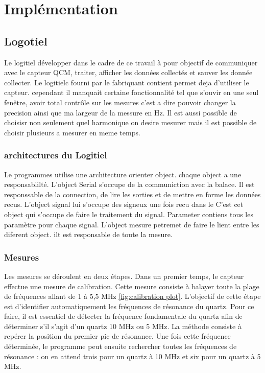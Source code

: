 \chapter{Implémentation}

\section{Logotiel}
Le logitiel développer dans le cadre de ce travail à pour objectif de communiquer avec le capteur QCM, traiter, afficher les données collectés et sauver les donnée collecter.
Le logitielc fourni par le fabriquant contient permet deja d'utiliser le capteur. cependant il manquait certaine fonctionnalité tel que s'ouvir en une seul fenêtre,
avoir total contrôle sur les mesures c'est a dire pouvoir changer la precision ainsi que ma largeur de la messure en Hz. 
Il est aussi possible de choisisr non seulement quel harmonique on desire mesurer mais il est possible de choisir plusieurs a mesurer en meme temps.
\subsection{architectures du Logitiel}
Le programmes utilise une architecture orienter object. chaque object a une responsablilté. L'object Serial s'occupe de la communiction avec la balace. Il est responssable de la connection, de lire les sorties et de mettre en forme les données recus.
L'object signal lui s'occupe des signeux une fois recu dans le C'est cet object qui s'occupe de faire le traitement du signal. Parameter contiens tous les paramètre pour chaque signal. L'object mesure petremet de faire le lient entre les diferent object. ilt est responsable de toute la mesure. 

\subsection{Mesures}
Les mesures se déroulent en deux étapes.
Dans un premier temps, le capteur effectue une mesure de calibration. Cette mesure consiste à balayer toute la plage de fréquences allant de 1 à 5,5 MHz \ref{fig:calibration plot}.
L’objectif de cette étape est d’identifier automatiquement les fréquences de résonance du quartz. Pour ce faire, il est essentiel de détecter la fréquence fondamentale du quartz afin de déterminer s’il s’agit d’un quartz 10 MHz ou 5 MHz.
La méthode consiste à repérer la position du premier pic de résonance. Une fois cette fréquence déterminée, le programme peut ensuite rechercher toutes les fréquences de résonance : on en attend trois pour un quartz à 10 MHz et six pour un quartz à 5 MHz.

